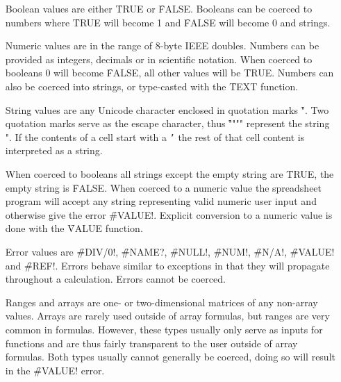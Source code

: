\begin{itemize}
\item[Boolean] values are either \f{TRUE} or \f{FALSE}. Booleans can be coerced to numbers where \f{TRUE} will become 1 and \f{FALSE} will become 0 and strings.
\item[Numeric] values are in the range of 8-byte IEEE doubles. Numbers can be provided as integers, decimals or in scientific notation.
When coerced to booleans 0 will become \f{FALSE}, all other values will be \f{TRUE}. Numbers can also be coerced into strings, or type-casted with the \f{TEXT} function.

\item[String] values are any Unicode character enclosed in quotation marks \f{"}.
Two quotation marks serve as the escape character, thus \f{""""} represent the string ".
If the contents of a cell start with a \texttt{'} the rest of that cell content is interpreted as a string.

When coerced to booleans all strings except the empty string are \f{TRUE}, the empty string is \f{FALSE}.
When coerced to a numeric value the spreadsheet program will accept any string representing valid numeric user input and otherwise give the error \f{\#VALUE!}. Explicit conversion to a numeric value is done with the \f{VALUE} function.

\item[Error] values are \f{\#DIV/0!}, \f{\#NAME?}, \f{\#NULL!}, \f{\#NUM!}, \f{\#N/A!}, \f{\#VALUE!} and \f{\#REF!}.
Errors behave similar to exceptions in that they will propagate throughout a calculation. Errors cannot be coerced.

\item[Ranges and arrays] are one- or two-dimensional matrices of any non-array values. Arrays are rarely used outside of array formulas, but ranges are very common in formulas.
However, these types usually only serve as inputs for functions and are thus fairly transparent to the user outside of array formulas.
Both types usually cannot generally be coerced, doing so will result in the \f{\#VALUE!} error.
\end{itemize}

